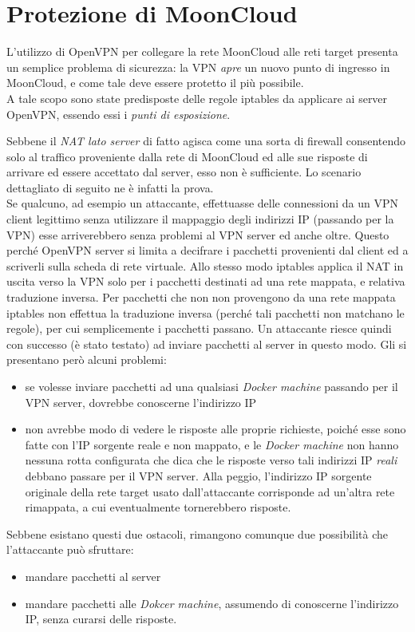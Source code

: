 \section{Protezione di MoonCloud}
L'utilizzo di OpenVPN per collegare la rete MoonCloud alle reti
target presenta un semplice problema di sicurezza: la VPN \textit{apre}
un nuovo punto di ingresso in MoonCloud, e come tale deve essere protetto
il più possibile.\\
A tale scopo sono state predisposte delle regole iptables da applicare
ai server OpenVPN, essendo essi i \textit{punti di esposizione}.


Sebbene il \textit{NAT lato server} di fatto agisca come una sorta
di firewall consentendo solo al traffico proveniente dalla rete
di MoonCloud ed alle sue risposte di arrivare ed essere accettato
dal server, esso non è sufficiente. Lo scenario dettagliato di seguito
ne è infatti la prova.\\
Se qualcuno, ad esempio un attaccante,
effettuasse delle connessioni da un VPN client legittimo senza utilizzare il mappaggio
degli indirizzi IP (passando per la VPN) esse arriverebbero senza problemi
al VPN server ed anche oltre. Questo perché OpenVPN server si limita
a decifrare i pacchetti provenienti dal client ed a scriverli sulla scheda di rete
virtuale. Allo stesso modo iptables applica il NAT in uscita verso la VPN solo per
i pacchetti destinati ad una rete mappata, e relativa traduzione inversa. Per pacchetti
che non non provengono da una rete mappata iptables non effettua la traduzione
inversa (perché tali pacchetti non matchano le regole), per cui semplicemente
i pacchetti passano.
Un attaccante riesce quindi con successo (è stato testato) ad inviare pacchetti
al server in questo modo.
Gli si presentano però alcuni problemi:
\begin{itemize}
	\item se volesse inviare pacchetti ad una qualsiasi \textit{Docker machine}
	      passando per il VPN server, dovrebbe conoscerne l'indirizzo IP
	\item non avrebbe modo di vedere le risposte alle proprie richieste, poiché
	      esse sono fatte con l'IP sorgente reale e non mappato, e le \textit{Docker machine}
	      non hanno nessuna rotta configurata che dica che le risposte verso tali indirizzi
	      IP \textit{reali} debbano passare per il VPN server. Alla peggio, l'indirizzo IP
	      sorgente originale della rete target usato dall'attaccante corrisponde
	      ad un'altra rete rimappata, a cui eventualmente tornerebbero risposte.
\end{itemize}
Sebbene esistano questi due ostacoli, rimangono comunque due possibilità che
l'attaccante può sfruttare:
\begin{itemize}
	\item mandare pacchetti al server
	\item mandare pacchetti alle \textit{Dokcer machine}, assumendo di conoscerne
	      l'indirizzo IP, senza curarsi delle risposte.
\end{itemize}

